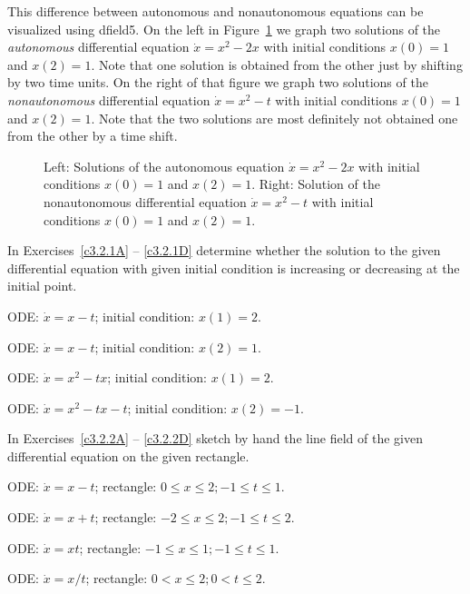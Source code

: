 \documentclass{ximera}
\begin{document}
This difference between autonomous and nonautonomous equations can be
visualized using {\sf dfield5}. On the left in Figure~\ref{F:non-auto}
we graph two solutions of the {\em autonomous\/} differential equation
$\dot{x}=x^2-2x$ with initial conditions $x(0)=1$ and $x(2)=1$.  Note
that one solution is obtained from the other just by shifting by two
time units.  On the right of that figure we graph two solutions of the
{\em nonautonomous\/} differential equation $\dot{x}=x^2-t$ with
initial conditions $x(0)=1$ and $x(2)=1$.  Note that the two solutions
are most definitely not obtained one from the other by a time shift.

\begin{figure}[htb]
        \centerline{%
	}
        \caption{Left: Solutions of the autonomous equation $\dot{x}=x^2-2x$
	with initial conditions $x(0)=1$ and $x(2)=1$. Right: Solution of
	the nonautonomous differential equation $\dot{x}=x^2-t$ with initial
	conditions $x(0)=1$ and $x(2)=1$.}
        \label{F:non-auto}
\end{figure}


\EXER

\TEXER

\noindent In Exercises~\ref{c3.2.1A} -- \ref{c3.2.1D} determine whether the 
solution to the given differential equation with given initial condition is 
increasing or decreasing at the initial point.
\begin{exercise} \label{c3.2.1A}
ODE: $\dot{x}=x-t$; initial condition: $x(1)=2$.
\end{exercise}
\begin{exercise} \label{c3.2.1B}
ODE: $\dot{x}=x-t$; initial condition: $x(2)=1$.
\end{exercise}
\begin{exercise} \label{c3.2.1C}
ODE: $\dot{x}=x^2-tx$; initial condition: $x(1)=2$.
\end{exercise}
\begin{exercise} \label{c3.2.1D}
ODE: $\dot{x}=x^2-tx-t$; initial condition: $x(2)=-1$.
\end{exercise}

\noindent In Exercises~\ref{c3.2.2A} -- \ref{c3.2.2D} sketch by hand the line 
field of the given differential equation on the given rectangle.
\begin{exercise} \label{c3.2.2A}
ODE: $\dot{x}=x-t$; rectangle: $0\leq x\leq 2; -1\leq t\leq 1$.
\end{exercise}
\begin{exercise} \label{c3.2.2B}
ODE: $\dot{x}=x+t$; rectangle: $-2\leq x\leq 2; -1\leq t\leq 2$.
\end{exercise}
\begin{exercise} \label{c3.2.2C}
ODE: $\dot{x}=xt$; rectangle: $-1\leq x\leq 1; -1\leq t\leq 1$.
\end{exercise}
\begin{exercise} \label{c3.2.2D}
ODE: $\dot{x}=x/t$; rectangle: $0< x\leq 2; 0< t\leq 2$.
\end{exercise}
\end{document}
